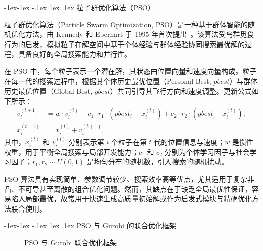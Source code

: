 \documentclass{write_paper}
\makeatletter
\renewcommand\subsection{\@startsection{subsection}{2}{\z@}%
                                     {-1ex\@plus -1ex \@minus -.1ex}%
                                     {1ex \@plus .1ex}%
                                     {\normalfont \normalsize \bfseries}}
\makeatother
\begin{document}
\subsection{粒子群优化算法（PSO）}

粒子群优化算法（Particle Swarm Optimization, PSO）是一种基于群体智能的随机优化方法，由 Kennedy 和 Eberhart 于 1995 年首次提出~\cite{kennedy1995particle}。该算法受鸟群觅食行为的启发，模拟粒子在解空间中基于个体经验与群体经验协同搜索最优解的过程，具备良好的全局搜索能力和并行性。

在 PSO 中，每个粒子表示一个潜在解，其状态由位置向量和速度向量构成。粒子在每一代的搜索过程中，根据其个体历史最优位置（Personal Best, $pbest$）与群体历史最优位置（Global Best, $gbest$）共同引导其飞行方向和速度调整。更新公式如下所示：
\[
\begin{aligned}
v_i^{(t+1)} &= w \cdot v_i^{(t)} + c_1 \cdot r_1 \cdot (pbest_i - x_i^{(t)}) + c_2 \cdot r_2 \cdot (gbest - x_i^{(t)}), \\
x_i^{(t+1)} &= x_i^{(t)} + v_i^{(t+1)},
\end{aligned}
\]
其中，$x_i^{(t)}$ 和 $v_i^{(t)}$ 分别表示第 $i$ 个粒子在第 $t$ 代的位置信息与速度；$w$ 是惯性权重，用于平衡全局搜索与局部开发能力；$c_1$ 和 $c_2$ 分别为个体学习因子与社会学习因子；$r_1, r_2 \sim U(0,1)$ 是均匀分布的随机数，引入搜索的随机扰动。

PSO 算法具有实现简单、参数调节较少、搜索效率高等优点，尤其适用于复杂非凸、不可导甚至离散的组合优化问题。然而，其缺点在于缺乏全局最优性保证，容易陷入局部最优，故常用于快速生成高质量初始解或作为启发式模块与精确优化方法联合使用。

\subsection{PSO 与 Gurobi 的联合优化框架}

\begin{figure}
\vspace{-1ex}
\centering
{}
\caption{PSO 与 Gurobi 联合优化框架}
\label{fig:framework}
\vspace{-1ex}
\end{figure}
\end{document}
